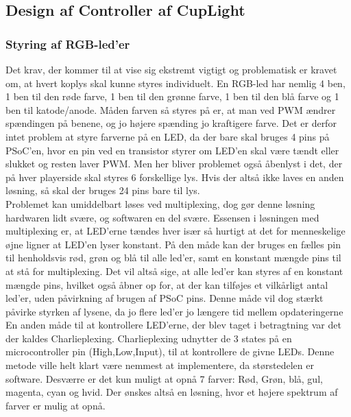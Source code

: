 \documentclass[HardwareDesign/HardwareDesign_main.tex]{subfiles}
\begin{document}
\subsection{Design af Controller af CupLight}
\subsubsection{Styring af RGB-led'er}
Det krav, der kommer til at vise sig ekstremt vigtigt og problematisk er kravet om, at hvert koplys skal kunne styres individuelt. En RGB-led har nemlig 4 ben, 1 ben til den røde farve, 1 ben til den grønne farve, 1 ben til den blå farve og 1 ben til katode/anode. Måden farven så styres på er, at man ved PWM ændrer spændingen på benene, og jo højere spænding jo kraftigere farve. Det er derfor intet problem at styre farverne på en LED, da der bare skal bruges 4 pins på PSoC'en, hvor en pin ved en transistor styrer om LED'en skal være tændt eller slukket og resten laver PWM. Men her bliver problemet også åbenlyst i det, der på hver playerside skal styres 6 forskellige lys. Hvis der altså ikke laves en anden løsning, så skal der bruges 24 pins bare til lys. 
\\Problemet kan umiddelbart løses ved multiplexing, dog gør denne løsning hardwaren lidt svære, og softwaren en del svære. Essensen i løsningen med multiplexing er, at LED'erne tændes hver især så hurtigt at det for menneskelige øjne ligner at LED'en lyser konstant. På den måde kan der bruges en fælles pin til henholdsvis rød, grøn og blå til alle led'er, samt en konstant mængde pins til at stå for multiplexing. Det vil altså sige, at alle led'er kan styres af en konstant mængde pins, hvilket også åbner op for, at der kan tilføjes et vilkårligt antal led'er, uden påvirkning af brugen af PSoC pins. Denne måde vil dog stærkt påvirke styrken af lysene, da jo flere led'er jo længere tid mellem opdateringerne
\\En anden måde til at kontrollere LED'erne, der blev taget i betragtning var det der kaldes Charlieplexing. Charlieplexing udnytter de 3 states på en microcontroller pin (High,Low,Input), til at kontrollere de givne LEDs. Denne metode ville helt klart være nemmest at implementere, da størstedelen er software. Desværre er det kun muligt at opnå 7 farver: Rød, Grøn, blå, gul, magenta, cyan og hvid. Der ønskes altså en løsning, hvor et højere spektrum af farver er mulig at opnå.
\end{document}
